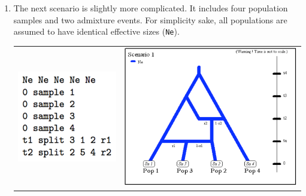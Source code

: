 \begin{enumerate}
\item The next scenario is slightly more complicated. It includes four population
samples and two admixture events. For simplicity sake, all populations
are assumed to have identical effective sizes (\texttt{Ne}).\\



\begin{center}
\begin{tabular}{cc}
\includegraphics[scale=0.5]{code_scenario_04}  & \includegraphics[scale=0.35]{scenario_04} \tabularnewline
\end{tabular}
\par\end{center}



\end{enumerate}
